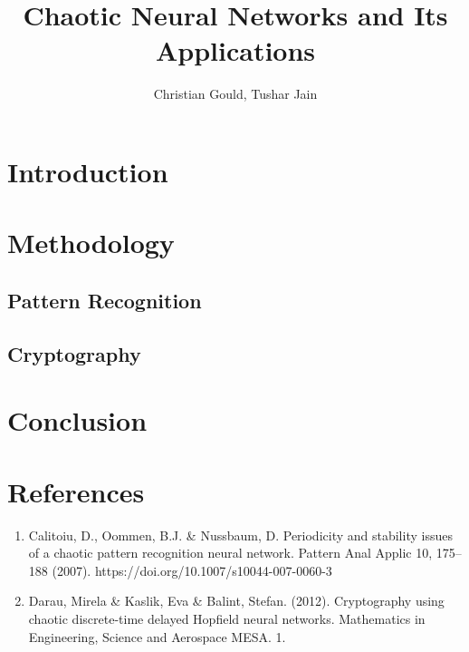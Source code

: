 \documentclass[12pt, letterpaper]{article}
\title{Chaotic Neural Networks and Its Applications}
\author{Christian Gould, Tushar Jain}
\date{}
\begin{document}
\maketitle

\section*{Introduction}

\section*{Methodology}

\subsection*{Pattern Recognition}

\subsection*{Cryptography}

\section*{Conclusion}


\section*{References}

\fontsize{8}{12}\selectfont

\begin{enumerate}[leftmargin=*]
    \item Calitoiu, D., Oommen, B.J. \& Nussbaum, D. Periodicity and stability issues of a chaotic pattern recognition neural network. Pattern Anal Applic 10, 175–188 (2007). https://doi.org/10.1007/s10044-007-0060-3
    \item Darau, Mirela \& Kaslik, Eva \& Balint, Stefan. (2012). Cryptography using chaotic discrete-time delayed Hopfield neural networks. Mathematics in Engineering, Science and Aerospace MESA. 1.
\end{enumerate}
\end{document}
